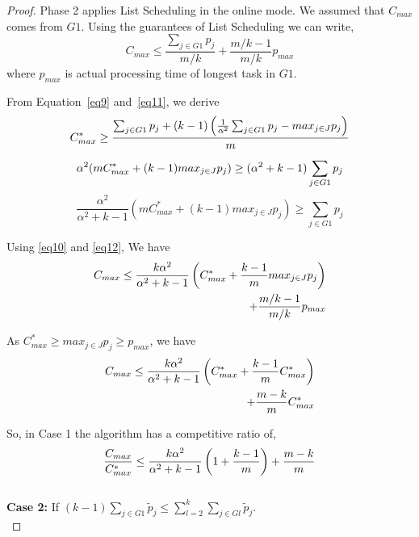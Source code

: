 \documentclass[10pt, conference, compsocconf]{IEEEtran}
\begin{document}
\begin{proof}
  Phase 2 applies List Scheduling in the online mode. We assumed that
  $C_{max}$ comes from $G1$. Using the guarantees of List Scheduling
  we can write,
  \begin{equation}\label{eq10}
    C_{max} \leq \frac{\sum_{j \in G1 }^{}{{p_{j}}}}{m/k} + {\frac{m/k-1}{m/k}} p_{max}
  \end{equation}
  where $p_{max}$ is actual processing time of longest task in $G1$.

  From Equation~\ref{eq9} and~\ref{eq11}, we derive
  \begin{equation}{\nonumber}
    C_{max}^{*} \geq  \frac{\sum_{j \in G1 }^{}{{p_{j}}}+ (k-1)\left(\frac{1}{\alpha^{2}}\sum_{j \in G1 }^{}{{p_{j}}}-  {max_{j \in J}}{{p_{j}}}\right)}{m}
  \end{equation}
  \begin{equation}{\nonumber}
    \alpha^{2} (mC_{max}^{*} + (k-1){max_{j \in J}}{{p_{j}}}) \geq  (\alpha^{2} + k-1) \sum_{j \in G1 }^{}{{p_{j}}}  
  \end{equation}
  \begin{equation}\label{eq12}
    \frac{\alpha^{2}}{\alpha^{2}+k-1}\left(m C_{max}^{*}+(k-1) {max_{j \in J}}{{p_{j}}}\right) \geq \sum_{j \in G1 }^{}{{p_{j}}}  
  \end{equation}
  
  Using \ref{eq10} and \ref{eq12}, We have
  \begin{align}{\nonumber}
    C_{max} \leq \frac{k\alpha^{2}}{\alpha^{2}+k-1}\left( C_{max}^{*}+\frac{k-1}{m} {max_{j \in J}}{{p_{j}}}\right)\\
    + {\frac{m/k-1}{m/k}} p_{max} \nonumber
  \end{align}
  
  As $C_{max}^{*}\geq {{max_{j \in J}}{p_{j}}}\geq p_{max}$, we have
  \begin{align}{\nonumber}
    C_{max} \leq \frac{k\alpha^{2}}{\alpha^{2}+k-1}\left( C_{max}^{*}+ {\frac{k-1}{m}}{C_{max}^{*}}\right)\\
    + {\frac{m-k}{m}} C_{max}^{*} \nonumber
  \end{align}    
  
  So, in Case 1 the algorithm has a competitive ratio of,
  \begin{equation}{\nonumber}
    \frac{C_{max}}{C_{max}^{*}} \leq \frac{k\alpha^{2}}{\alpha^{2}+k-1}\left( 1+ {\frac{k-1}{m}} \right) + {\frac{m-k}{m}} \end{equation}\\
  
  \textbf{Case 2:} If $(k-1)\sum_{j \in G1 }^{}{\tilde p_{j}} \leq \sum_{l=2}^{k}\sum_{j \in Gl }^{}{\tilde p_{j}}$. \\
  

\end{proof}
\end{document}
